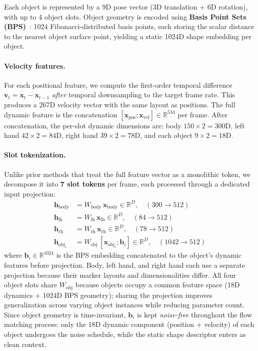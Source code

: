 \documentclass[sigconf, screen, review, anonymous]{acmart}
\begin{document}
Each object is represented by a 9D pose vector (3D translation + 6D rotation), with up to 4 object slots. Object geometry is encoded using \textbf{Basis Point Sets (BPS)}~\cite{prokudin2019efficient}: 1024 Fibonacci-distributed basis points, each storing the scalar distance to the nearest object surface point, yielding a static 1024D shape embedding per object.

\paragraph{Velocity features.}
For each positional feature, we compute the first-order temporal difference $\mathbf{v}_t = \mathbf{x}_t - \mathbf{x}_{t-1}$ \emph{after} temporal downsampling to the target frame rate. This produces a 267D velocity vector with the same layout as positions. The full dynamic feature is the concatenation $[\mathbf{x}_{\text{pos}}; \mathbf{x}_{\text{vel}}] \in \mathbb{R}^{534}$ per frame. After concatenation, the per-slot dynamic dimensions are: body $150{\times}2{=}300$D, left hand $42{\times}2{=}84$D, right hand $39{\times}2{=}78$D, and each object $9{\times}2{=}18$D.

\paragraph{Slot tokenization.}
Unlike prior methods that treat the full feature vector as a monolithic token, we decompose it into \textbf{7 slot tokens} per frame, each processed through a dedicated input projection:
\begin{align}
    \mathbf{h}_{\text{body}} &= W_{\text{body}} \, \mathbf{x}_{\text{body}} \in \mathbb{R}^D, \quad (300 \rightarrow 512) \\
    \mathbf{h}_{\text{lh}} &= W_{\text{lh}} \, \mathbf{x}_{\text{lh}} \in \mathbb{R}^D, \quad (84 \rightarrow 512) \\
    \mathbf{h}_{\text{rh}} &= W_{\text{rh}} \, \mathbf{x}_{\text{rh}} \in \mathbb{R}^D, \quad (78 \rightarrow 512) \\
    \mathbf{h}_{\text{obj}_i} &= W_{\text{obj}} \, [\mathbf{x}_{\text{obj}_i}; \mathbf{b}_i] \in \mathbb{R}^D, \quad (1042 \rightarrow 512)
    \label{eq:slot_proj}
\end{align}
where $\mathbf{b}_i \in \mathbb{R}^{1024}$ is the BPS embedding concatenated to the object's dynamic features before projection. Body, left hand, and right hand each use a separate projection because their marker layouts and dimensionalities differ. All four object slots share $W_{\text{obj}}$ because objects occupy a common feature space (18D dynamics $+$ 1024D BPS geometry); sharing the projection improves generalization across varying object instances while reducing parameter count.
Since object geometry is time-invariant, $\mathbf{b}_i$ is kept \emph{noise-free} throughout the flow matching process: only the 18D dynamic component (position + velocity) of each object undergoes the noise schedule, while the static shape descriptor enters as clean context.
\end{document}
